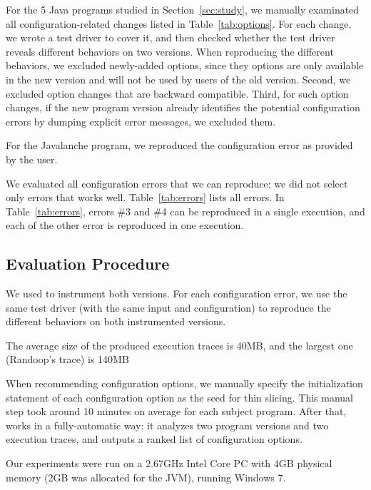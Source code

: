 

For the 5 Java programs studied in Section~\ref{sec:study},
we manually examinated all configuration-related changes
listed in Table~\ref{tab:options}. For each
change, we wrote a test driver to cover
it, and then checked whether the test driver
reveals different behaviors on two versions.
When reproducing the different behaviors,
we excluded newly-added options, since
they options are only available in the new version
and will not be used by users of the old version.
Second, we excluded option changes that are backward
compatible. Third, for such option changes, if the
new program version already identifies the potential
configuration errors by dumping explicit error messages,
we excluded them. 

For the Javalanche program, we reproduced the configuration
error as provided by the user.

We evaluated all configuration errors that we can reproduce;
we did not select only errors that \ourtool works well.
Table~\ref{tab:errors} lists all errors.
In Table~\ref{tab:errors}, errors \#3 and \#4
can be reproduced in a single execution, and each of the other
error is reproduced in one execution.



\subsection{Evaluation Procedure}

We used \ourtool to instrument both versions. 
For each configuration error, we use the same test driver
(with the same input and configuration)
to reproduce the different behaviors on both instrumented versions.

The average size of the produced execution traces is 40MB,
and the largest one (Randoop's trace) is 140MB



When recommending configuration options, we manually specify
the initialization statement of each configuration option as
the seed for thin slicing. This manual step took around
10 minutes on average for each subject program. After that,
\ourtool works in a fully-automatic way: it 
analyzes two program versions and two execution traces,
and outputs a ranked list of configuration options.

Our experiments were run on a 2.67GHz Intel Core PC
with 4GB physical memory (2GB was allocated for the JVM),
running Windows 7.

